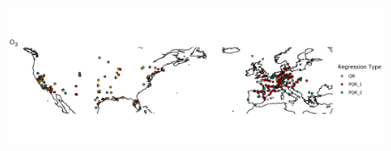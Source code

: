 \documentclass{article}
\begin{document}
\begin{figure}
\centering
\includegraphics[width=\linewidth]{figures/si_figures/regression_type/regression_type_map.pdf}
\caption{}
\label{si_fig:reg_map}
\end{figure}
\clearpage
\end{document}

